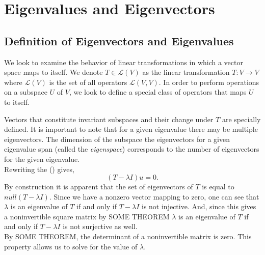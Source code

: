 \chapter{Eigenvalues and Eigenvectors}
\section{Definition of Eigenvectors and Eigenvalues}
We look to examine the behavior of linear transformations in which a vector space maps to itself. We denote $T \in \mathcal{L}(V)$ as the linear transformation $T: V \rightarrow V$ where $\mathcal{L}(V)$ is the set of all operators $\mathcal{L}(V,V)$. In order to perform operations on a subspace $U$ of $V$, we look to define a special class of operators that maps $U$ to itself. 

Vectors that constitute invariant subspaces and their change under $T $ are specially defined. 
It is important to note that for a given eigenvalue there may be multiple eigenvectors. The dimension of the subspace the eigenvectors for a given eigenvalue span (called the \textit{eigenspace}) corresponds to the number of eigenvectors for the given eigenvalue. \\
Rewriting the () gives,
\[(T-\lambda I)u = 0.\]
By construction it is apparent that the set of eigenvectors of $T$ is equal to $null(T-\lambda I)$.
Since we have a nonzero vector mapping to zero, one can see that $\lambda$ is an eigenvalue of $T$ if and only if $T-\lambda I$ is not injective. And, since this gives a noninvertible square matrix by SOME THEOREM $\lambda$ is an eigenvalue of $T$ if and only if $T-\lambda I$ is not surjective as well.\\
By SOME THEOREM, the determinant of a noninvertible matrix is zero. This property allows us to solve for the value of $\lambda$.

